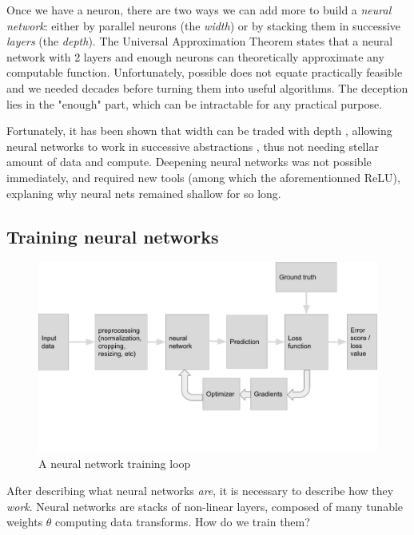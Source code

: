 Once we have a neuron, there are two ways we can add more to build a \emph{neural network}: either by parallel neurons (the \emph{width}) or by stacking them in successive \emph{layers} (the \emph{depth}). The Universal Approximation Theorem \citep{universalapprox} states that a neural network with 2 layers and enough neurons \cite{mlpbounds} can theoretically approximate any computable function. Unfortunately, possible does not equate practically feasible and we needed decades before turning them into useful algorithms. The deception lies in the "enough" part, which can be intractable for any practical purpose.

Fortunately, it has been shown that width can be traded with depth \cite{widthdepth}, allowing neural networks to work in successive abstractions \citep{deepbelief,deepviz}, thus not needing stellar amount of data and compute. Deepening neural networks was not possible immediately, and required new tools (among which the aforementionned ReLU), explaning why neural nets remained shallow for so long.

\subsection{Training neural networks}

\begin{figure}[ht]
    \centering
    \includegraphics[width=\columnwidth]{30-activity/workflow.pdf}
    \caption{A neural network training loop}
    \label{fig:trainingloop}
\end{figure}

After describing what neural networks \emph{are}, it is necessary to describe how they \emph{work}. Neural networks are stacks of non-linear layers, composed of many tunable weights $\theta$ computing data transforms. How do we train them?

